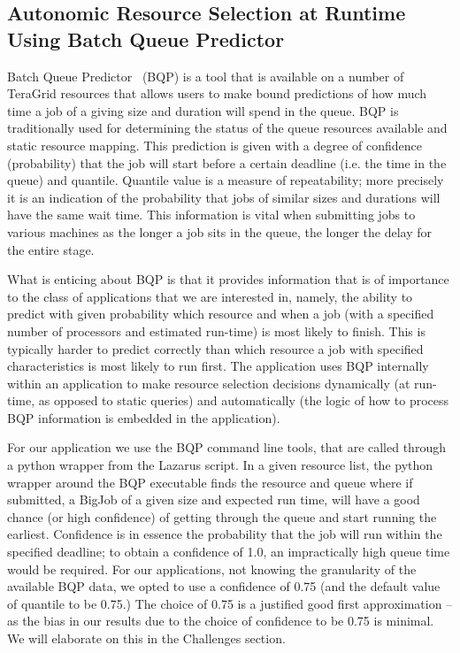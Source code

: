 \documentclass[conference,final]{IEEEtran}
\begin{document}
\subsection{Autonomic Resource Selection at Runtime Using Batch Queue
  Predictor}
Batch Queue Predictor~\cite{bqp, bqp_url} (BQP) is a tool that is
available on a number of TeraGrid resources that allows users to make
bound predictions of how much time a job of a giving size and duration
will spend in the queue.  BQP is traditionally used for determining
the status of the queue resources available and static resource
mapping. This prediction is given with a degree of confidence
(probability) that the job will start before a certain deadline
(i.e. the time in the queue) and quantile. Quantile value is a measure
of repeatability; more precisely it is an indication of the
probability that jobs of similar sizes and durations will have the
same wait time. This information is vital when submitting jobs to
various machines as the longer a job sits in the queue, the longer the
delay for the entire stage.

What is enticing about BQP is that it provides information that is of
importance to the class of applications that we are interested in,
namely, the ability to predict with given probability which resource
and when a job (with a specified number of processors and estimated
run-time) is most likely to finish.  This is typically harder to
predict correctly than which resource a job with specified
characteristics is most likely to run first.  The application uses BQP
internally within an application to make resource selection decisions
dynamically (at run-time, as opposed to static queries) and
automatically (the logic of how to process BQP information is embedded
in the application).

For our application we use the BQP command line tools, that are called
through a python wrapper from the Lazarus script.  In a given resource
list, the python wrapper around the BQP executable finds the resource
and queue where if submitted, a BigJob of a given size and expected
run time, will have a good chance (or high confidence) of getting
through the queue and start running the earliest. Confidence is in
essence the probability that the job will run within the specified
deadline; to obtain a confidence of 1.0, an impractically high queue
time would be required. For our applications, not knowing the
granularity of the available BQP data, we opted to use a confidence of
0.75 (and the default value of quantile to be 0.75.)  The choice of
0.75 is a justified good first approximation -- as the bias in our
results due to the choice of confidence to be 0.75 is minimal. We will
elaborate on this in the Challenges section.
\end{document}
